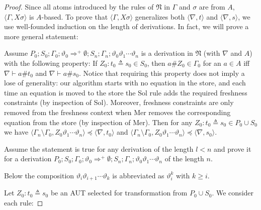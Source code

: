 \documentclass{llncs}
\newcommand{\Lra}{\Longrightarrow}
\newcommand{\frN}{\mathfrak N}
\newcommand{\np}[2]{\langle #1, \allowbreak #2\rangle}
\newcommand{\Atoms}{A}
\newcommand{\nablai}{{\nabla}}
\newcommand{\nablag}{\Gamma}
\begin{document}
\begin{proof} Since all atoms introduced by the rules
    of $\frN$ in $\nablag$ and $\sigma$ are from $\Atoms$,
    $\np{\nablag}{X\sigma}$ is $\Atoms$-based. To prove that
    $\np{\nablag}{X\sigma}$ generalizes both $\np{\nablai}{t}$ and
    $\np{\nablai}{s}$, we use well-founded induction on the length of
    derivations. In fact, we will prove a more general statement:

    Assume $P_0;S_0;\Gamma_0;\vartheta_0 \Lra^+ \emptyset;
    S_n;\Gamma_n;\vartheta_0\vartheta_1\cdots\vartheta_n$ is a
    derivation in $\frN$ (with $\nabla$ and $\Atoms$) with
      the following property: If $Z_0:t_0\triangleq s_0\in S_0$, then
      $a\# Z_0\in \nablag_0$ for an $a\in \Atoms$ iff $\nabla\vdash
      a\#t_0$ and $\nabla\vdash a\#s_0$. Notice that
      requiring this property does not imply a lose of generality: our
      algorithm starts with no equation in the store, and each time an
      equation is moved to the store the {\sf Sol} rule adds the
      required freshness constraints (by inspection of {\sf
        Sol}). Moreover, freshness constraints are only removed from
      the freshness context when {\sf Mer} removes the corresponding
      equation from the store (by inspection of {\sf Mer}).  Then for
    any $Z_0:t_0 \triangleq s_0\in P_0\cup S_0$ we have
    $\np{\Gamma_n\setminus \Gamma_0}{Z_0 \vartheta_1\cdots\vartheta_n}
    \preceq \np{\nabla}{t_0}$ and $\np{\Gamma_n\setminus \Gamma_0}{Z_0
      \vartheta_1\cdots\vartheta_n} \preceq \np{\nabla}{s_0}$.

Assume the statement is true for any derivation of the length $l < n$
and prove it for a derivation $P_0;S_0;\Gamma_0;\vartheta_0 \Lra^+
\emptyset; S_n;\Gamma_n;\vartheta_0\vartheta_1\cdots\vartheta_n$ of
the length $n$. 

Below the composition $\vartheta_i\vartheta_{i+1}\cdots\vartheta_k$ is abbreviated as $\vartheta_i^k$ with $ k\ge i$. 

Let $Z_0: t_0 \triangleq s_0$ be an AUT selected for transformation from $P_0\cup S_0$.  We consider each rule:\vspace{0.3cm}


\end{proof}
\end{document}
